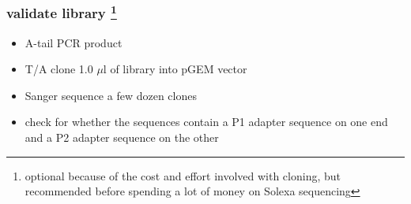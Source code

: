 %
%
%
%
%
%
\subsubsection
{validate library \protect \footnote{optional because of the cost and effort involved with cloning, but recommended before spending a lot of money on Solexa sequencing}}
\begin{itemize}
\item A-tail PCR product
\item T/A clone 1.0 $\mu$l of library into pGEM vector
\item Sanger sequence a few dozen clones
\item check for whether the sequences contain a P1 adapter sequence on one end and a P2 adapter sequence on the other
\end{itemize}

